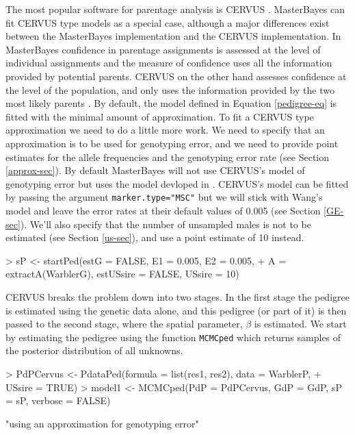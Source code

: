\documentclass{article}
\begin{document}
The most popular software for parentage analysis is CERVUS \citep{Marshall.1998}.  MasterBayes can fit CERVUS type models as a special case, although a major differences exist between the MasterBayes implementation and the CERVUS implementation.  In MasterBayes confidence in parentage assignments is assessed at the level of individual assignments and the measure of confidence uses all the information provided by potential parents.  CERVUS on the other hand assesses confidence at the level of the population, and only uses the information provided by the two most likely parents \citep{Nielsen.2001}. By default, the model defined in Equation \ref{pedigree-eq} is fitted with the minimal amount of approximation.  To fit a CERVUS type approximation we need to do a little more work.  We need to specify that an approximation is to be used for genotyping error, and we need to provide point estimates for the allele frequencies and the genotyping error rate (see Section \ref{approx-sec}). 
By default MasterBayes will not use CERVUS's model of genotyping error but uses the model devloped in \citet{Wang.2004}. CERVUS's model can be fitted by passing the argument \texttt{marker.type="MSC"} but we will stick with Wang's model and leave the error rates at their default values of 0.005 (see Section \ref{GE-sec}).  We'll also specify that the number of unsampled males is not to be estimated (see Section \ref{us-sec}), and use a point estimate of 10 instead. 

\begin{Schunk}
\begin{Sinput}
> sP <- startPed(estG = FALSE, E1 = 0.005, E2 = 0.005, 
+      A = extractA(WarblerG), estUSsire = FALSE, USsire = 10)
\end{Sinput}
\end{Schunk}


CERVUS breaks the problem down into two stages.  In the first stage the pedigree is estimated using the genetic data alone, and this pedigree (or part of it) is then passed to the second stage, where the spatial parameter, $\beta$ is estimated.  We start by estimating the pedigree using the function \texttt{MCMCped} which returns samples of the posterior distribution of all unknowns.

\begin{Schunk}
\begin{Sinput}
> PdPCervus <- PdataPed(formula = list(res1, res2), data = WarblerP, 
+     USsire = TRUE)
> model1 <- MCMCped(PdP = PdPCervus, GdP = GdP, sP = sP, verbose = FALSE)
\end{Sinput}
\begin{Soutput}
[1] "using an approximation for genotyping error"
\end{Soutput}
\end{Schunk}
\end{document}
